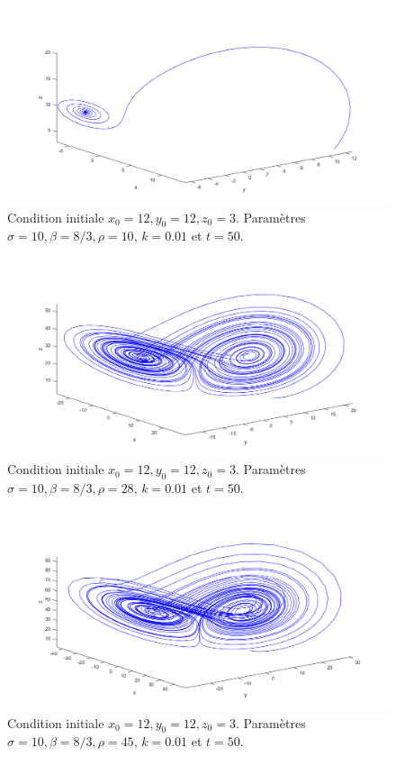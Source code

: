 \documentclass[a4paper, 12pt]{report}
\begin{document}
\begin{figure}[H]
  \centering
  \includegraphics[scale=0.7]{images/lorenz_condin2_10.png}
  \caption{Condition initiale $x_0 = 12, y_0 = 12, z_0=3$. Paramètres $\sigma=10, \beta=8/3, \rho=10$, $k=0.01$ et $t=50$.}
\end{figure}

\begin{figure}[H]
  \centering
  \includegraphics[scale=0.7]{images/lorenz_condin2_28.png}
  \caption{Condition initiale $x_0 = 12, y_0 = 12, z_0=3$. Paramètres $\sigma=10, \beta=8/3, \rho=28$, $k=0.01$ et $t=50$.}
\end{figure}

\begin{figure}[H]
  \centering
  \includegraphics[scale=0.7]{images/lorenz_condin2_45.png}
  \caption{Condition initiale $x_0 = 12, y_0 = 12, z_0=3$. Paramètres $\sigma=10, \beta=8/3, \rho=45$, $k=0.01$ et $t=50$.}
\end{figure}
\end{document}
